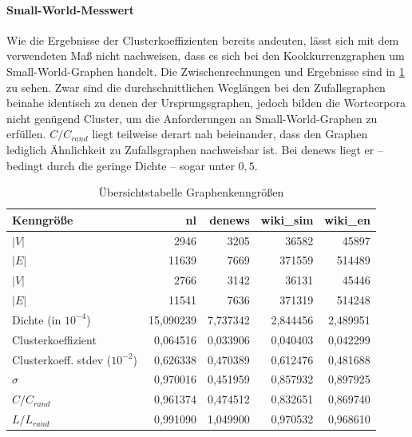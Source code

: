 \documentclass[11pt, a4paper]{article}
\begin{document}
\paragraph{Small-World-Messwert}
Wie die Ergebnisse der Clusterkoeffizienten bereits andeuten, lässt sich mit dem verwendeten Maß nicht nachweisen, dass es sich bei den Kookkurrenzgraphen um Small-World-Graphen handelt.
Die Zwischenrechnungen und Ergebnisse sind in \ref{tab-zsf} zu sehen.
Zwar sind die durchschnittlichen Weglängen bei den Zufallsgraphen beinahe identisch zu denen der Ursprungsgraphen, jedoch bilden die Wortcorpora nicht genügend Cluster, um die Anforderungen an Small-World-Graphen zu erfüllen.
$C/C_{rand}$ liegt teilweise derart nah beieinander, dass den Graphen lediglich Ähnlichkeit zu Zufallsgraphen nachweisbar ist.
Bei denews liegt er -- bedingt durch die geringe Dichte -- sogar unter $0,5$.

\begin{table}[ht]
    \begin{tabular}{l*{4}{r}}
    \toprule
    Kenngröße                     & nl        & denews    & wiki\_sim & wiki\_en \\
    \midrule
    $|V|$                          & 2946      & 3205      & 36582     & 45897  \\
    $|E|$                          & 11639     & 7669      & 371559    & 514489 \\
    $|V|$\footnotemark[9]          & 2766      & 3142      & 36131     & 45446  \\
    $|E|$\footnotemark[9]          & 11541     & 7636      & 371319    & 514248 \\
    Dichte (in $10^{-4}$)           & 15,090239 & 7,737342  & 2,844456  & 2,489951 \\
    Clusterkoeffizient             & 0,064516  & 0,033906  & 0,040403  & 0,042299 \\
    Clusterkoeff. stdev ($10^{-2}$) & 0,626338  & 0,470389  & 0,612476  & 0,481688 \\
    $\sigma$                       & 0,970016  & 0,451959  & 0,857932  & 0,897925  \\
    $C / C_{rand}$                  & 0,961374  & 0,474512  & 0,832651  & 0,869740 \\
    $L / L_{rand}$                  & 0,991090  & 1,049900  & 0,970532  & 0,968610 \\
    \bottomrule
    \end{tabular}
    \caption{Übersichtstabelle Graphenkenngrößen}
    \label{tab-zsf}
\end{table}
\end{document}
